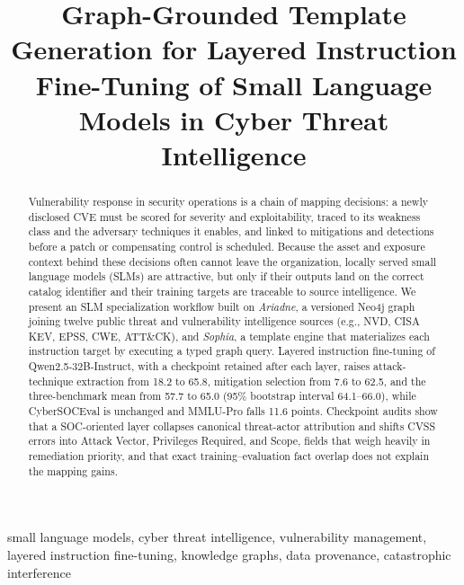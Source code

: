 \documentclass[conference]{IEEEtran}
\begin{document}

\title{Graph-Grounded Template Generation for Layered Instruction Fine-Tuning of Small Language Models in Cyber Threat Intelligence}

\author{}

\maketitle
\pagestyle{plain}
\thispagestyle{plain}

\begin{abstract}
Vulnerability response in security operations is a chain of mapping decisions: a newly disclosed CVE must be scored for severity and exploitability, traced to its weakness class and the adversary techniques it enables, and linked to mitigations and detections before a patch or compensating control is scheduled. Because the asset and exposure context behind these decisions often cannot leave the organization, locally served small language models (SLMs) are attractive, but only if their outputs land on the correct catalog identifier and their training targets are traceable to source intelligence. We present an SLM specialization workflow built on \emph{Ariadne}, a versioned Neo4j graph joining twelve public threat and vulnerability intelligence sources (e.g., NVD, CISA KEV, EPSS, CWE, ATT\&CK), and \emph{Sophia}, a template engine that materializes each instruction target by executing a typed graph query. Layered instruction fine-tuning of Qwen2.5-32B-Instruct, with a checkpoint retained after each layer, raises attack-technique extraction from 18.2 to 65.8, mitigation selection from 7.6 to 62.5, and the three-benchmark mean from 57.7 to 65.0 (95\% bootstrap interval 64.1--66.0), while CyberSOCEval is unchanged and MMLU-Pro falls 11.6 points. Checkpoint audits show that a SOC-oriented layer collapses canonical threat-actor attribution and shifts CVSS errors into Attack Vector, Privileges Required, and Scope, fields that weigh heavily in remediation priority, and that exact training--evaluation fact overlap does not explain the mapping gains.
\end{abstract}

\begin{IEEEkeywords}
small language models, cyber threat intelligence, vulnerability management, layered instruction fine-tuning, knowledge graphs, data provenance, catastrophic interference
\end{IEEEkeywords}
\end{document}
